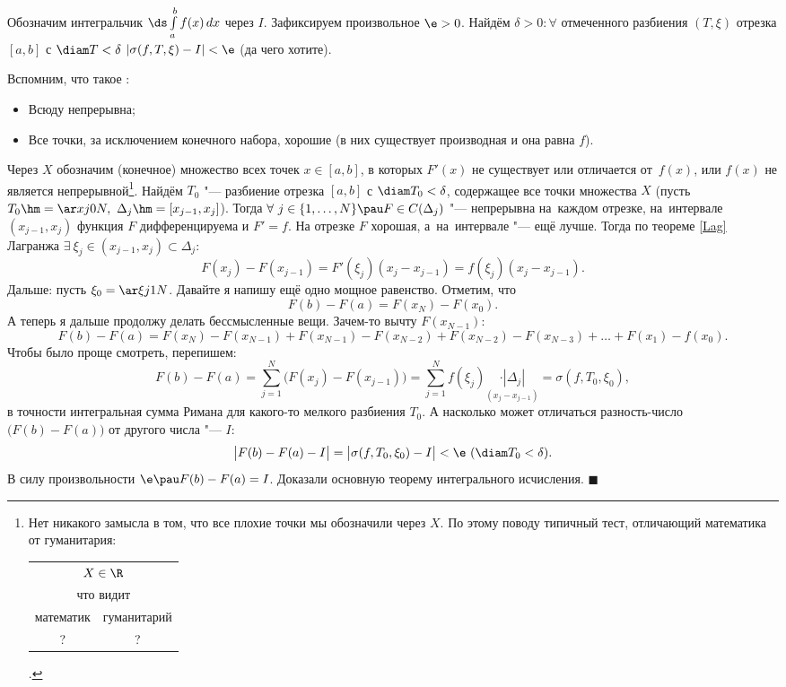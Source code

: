 \documentclass[a4paper,10pt,twoside]{article}
\newenvironment{Proof}
       {\par\noindent{\textbf{Доказательство.}}}
       {\hfill$\scriptstyle\blacksquare$}
\begin{document}
    \begin{Proof}
    	Обозначим интегральчик $\ds\int\limits_a^bf(x)\,dx$ через $I$.
    	Зафиксируем произвольное $\e>0$. Найдём $\delta>0\colon \forall$ отмеченного разбиения $(T,\xi)$
    	 отрезка $[a,b]$ с $\diam T<\delta$\pau
    	$|\sigma(f,T,\xi)-I|<\e$ (да чего хотите).
    	
    	Вспомним, что такое \op{}:
    	\begin{itemize}
    	  \item Всюду непрерывна;
    	  \item Все точки, за исключением конечного набора, хорошие (в них существует производная и она равна $f$).
    	\end{itemize}
    	Через $X$ обозначим (конечное) множество всех точек $x\in[a,b]$,
    	 в которых 	$ F'(x)$ не существует или отличается от~$f(x)$, или $f(x)$ не является непрерывной\footnote{Нет никакого
    	замысла в том, что все плохие точки мы обозначили через $X$. По этому поводу типичный тест, отличающий математика от гуманитария:
    	\begin{tabular}{|c|c|}
    	\hline
    	\multicolumn{2}{|c|}{$ X\in\R$}\\
    	\multicolumn{2}{|c|}{что видит}\\
    	математик&гуманитарий\\
    	?&?\\
    	\hline
    	\end{tabular}.}.
    	Найдём $T_0$ "--- разбиение отрезка $[a,b]$ с $\diam T_0<\delta$, содержащее все точки множества $X$
    	(пусть $T_0\hm=\ar xj0N,\ \Delta_j\hm=[x_{j-1},x_j]$). Тогда
    	$\forall\  j\in \{1,\ldots,N\}\pau F\in C(\Delta_j)$ "--- непрерывна на~каждом отрезке, на~интервале $(x_{j-1},x_j)$ функция
    	$F$ дифференцируема и $F'=f$. На отрезке $F$ хорошая, а~на~интервале "--- ещё лучше.
    	Тогда по теореме \ref{Lag} Лагранжа $\exists\  \xi_j\in(x_{j-1},x_j)\subset \Delta_j\colon$
    	\[F(x_j)-F(x_{j-1})=F'(\xi_j)(x_j-x_{j-1})=f(\xi_j)(x_j-x_{j-1}).\]
    	Дальше: пусть $\xi_0=\ar\xi j1N$. Давайте я напишу ещё одно мощное равенство. Отметим, что
    	\[F(b)-F(a)=F(x_N)-F(x_0).\]
    	А теперь я дальше продолжу делать бессмысленные вещи. Зачем-то вычту $F(x_{N-1})$:
    	\[F(b)-F(a)=F(x_N)-F(x_{N-1})+F(x_{N-1})-F(x_{N-2})+F(x_{N-2})-F(x_{N-3})+\ldots+F(x_1)-f(x_0).\]
    	Чтобы было проще смотреть, перепишем:
    	\[F(b)-F(a)=\sum\limits_{j=1}^N\big(F(x_j)-F(x_{j-1})\big)=\sum\limits_{j=1}^Nf(\xi_j)\underset{(x_j-x_{j-1})}{\cdot|\Delta_j|}=
    	\sigma(f,T_0,\xi_0),\]
    	в точности интегральная сумма Римана для какого-то мелкого разбиения $T_0$. А насколько может отличаться разность-число
    	$\big(F(b)-F(a)\big)$ от другого числа "--- $I$:
    	\[\big|F(b)-F(a)-I\big|=\big|\sigma(f,T_0,\xi_0)-I\big|<\e\text{ ($\diam T_0<\delta$)}.\]
    	В силу произвольности $\e\pau F(b)-F(a)=I$.
    	Доказали основную теорему интегрального исчисления.
    \end{Proof}
    
\end{document}
